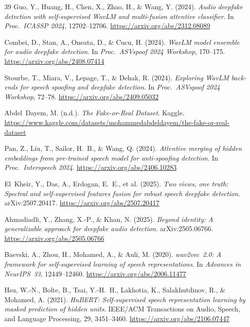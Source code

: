 \documentclass[11pt,a4paper]{article}
\begin{document}
\begin{thebibliography}{39}
Guo, Y., Huang, H., Chen, X., Zhao, H., \& Wang, Y. (2024).
\textit{Audio deepfake detection with self-supervised WavLM and multi-fusion attentive classifier}.
In \textit{Proc.\ ICASSP 2024}, 12702--12706.
\url{https://arxiv.org/abs/2312.08089}

Combei, D., Stan, A., Oneata, D., \& Cucu, H. (2024).
\textit{WavLM model ensemble for audio deepfake detection}.
In \textit{Proc.\ ASVspoof 2024 Workshop}, 170--175.
\url{https://arxiv.org/abs/2408.07414}

Stourbe, T., Miara, V., Lepage, T., \& Dehak, R. (2024).
\textit{Exploring WavLM back-ends for speech spoofing and deepfake detection}.
In \textit{Proc.\ ASVspoof 2024 Workshop}, 72--78.
\url{https://arxiv.org/abs/2409.05032}

Abdel~Dayem, M. (n.d.).
\textit{The Fake-or-Real Dataset}. Kaggle.
\url{https://www.kaggle.com/datasets/mohammedabdeldayem/the-fake-or-real-dataset}

Pan, Z., Liu, T., Sailor, H.~B., \& Wang, Q. (2024).
\textit{Attentive merging of hidden embeddings from pre-trained speech model for
anti-spoofing detection}.
In \textit{Proc.\ Interspeech 2024}.
\url{https://arxiv.org/abs/2406.10283}

El~Kheir, Y., Das, A., Erdogan, E.~E., et al. (2025).
\textit{Two views, one truth: Spectral and self-supervised features fusion for
robust speech deepfake detection}. arXiv:2507.20417.
\url{https://arxiv.org/abs/2507.20417}

Ahmadiadli, Y., Zhang, X.-P., \& Khan, N. (2025).
\textit{Beyond identity: A generalizable approach for deepfake audio detection}.
arXiv:2505.06766.
\url{https://arxiv.org/abs/2505.06766}

Baevski, A., Zhou, H., Mohamed, A., \& Auli, M. (2020).
\textit{wav2vec~2.0: A framework for self-supervised learning of speech representations}.
In \textit{Advances in NeurIPS~33}, 12449--12460.
\url{https://arxiv.org/abs/2006.11477}

Hsu, W.-N., Bolte, B., Tsai, Y.-H.~H., Lakhotia, K., Salakhutdinov, R.,
\& Mohamed, A. (2021).
\textit{HuBERT: Self-supervised speech representation learning by masked
prediction of hidden units}.
IEEE/ACM Transactions on Audio, Speech, and Language Processing, 29, 3451--3460.
\url{https://arxiv.org/abs/2106.07447}


\end{thebibliography}
\end{document}
